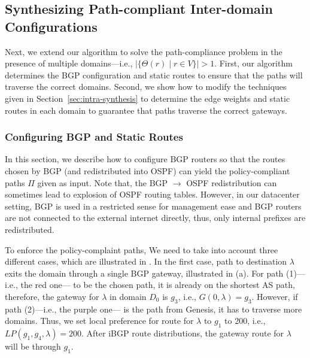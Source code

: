 \subsection{Synthesizing Path-compliant Inter-domain Configurations}
\label{sec:inter-synthesis}

Next, we extend our algorithm to
solve the path-compliance problem in the presence
of multiple domains---i.e., $|\{\Theta(r) \mid r\in V\}|>1$.
First, our algorithm determines the 
BGP configuration and static routes to ensure that the 
paths will traverse the correct domains.
Second, we show how to modify the 
techniques given in Section~\ref{sec:intra-synthesis}
to determine the edge weights and static routes
 in each domain to guarantee that paths traverse
the correct gateways. 


\subsubsection{Configuring BGP and Static Routes}
In this section, we describe how to configure
BGP routers so that the routes chosen by BGP 
(and redistributed into OSPF) 
can yield the policy-compliant
paths $\Pi$ given as input. 
Note that, the BGP $\rightarrow$ OSPF redistribution
can sometimes lead to explosion of OSPF routing tables. However, 
in our datacenter setting, BGP is used in a restricted
sense for management ease and BGP routers are not connected
to the external internet directly, thus, only internal
prefixes are redistributed.


To enforce the policy-complaint paths, 
We need to take into account three different
cases, which are illustrated in .  
In the first case, path to destination $\lambda$
exits the domain through a single BGP gateway, illustrated in 
(a). For path (1)---i.e., the red one---
to be the chosen path, it is already on the shortest AS path, 
therefore, the gateway for $\lambda$ in domain $D_0$ is $g_3$, i.e.,
$G(0, \lambda) = g_3$. However, if path (2)---i.e., the purple one---
is the path from Genesis, it has to traverse more domains. Thus, 
we set local preference for route for $\lambda$ to $g_1$ to 200, i.e.,
$LP(g_1, g_4, \lambda) = 200$. After iBGP route distributions, the 
gateway route for $\lambda$ will be through $g_1$.


